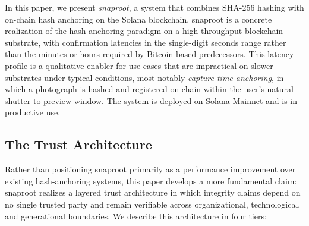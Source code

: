 \documentclass[11pt,a4paper]{article}
\begin{document}
In this paper, we present \emph{snaproot}, a system that combines SHA-256
hashing with on-chain hash anchoring on the Solana blockchain. snaproot is
a concrete realization of the hash-anchoring paradigm on a high-throughput
blockchain substrate, with confirmation latencies in the single-digit
seconds range rather than the minutes or hours required by Bitcoin-based
predecessors. This latency profile is a qualitative enabler for use cases that are impractical on slower
substrates under typical conditions, most notably
\emph{capture-time anchoring}, in which a photograph is hashed
and registered on-chain within the user's natural shutter-to-preview
window. The system is deployed on Solana Mainnet and is in productive use.

\subsection{The Trust Architecture}

Rather than positioning snaproot primarily as a performance improvement
over existing hash-anchoring systems, this paper develops a more
fundamental claim: snaproot realizes a layered trust architecture in
which integrity claims depend on no single trusted party and remain
verifiable across organizational, technological, and generational
boundaries. We describe this architecture in four tiers:
\end{document}
